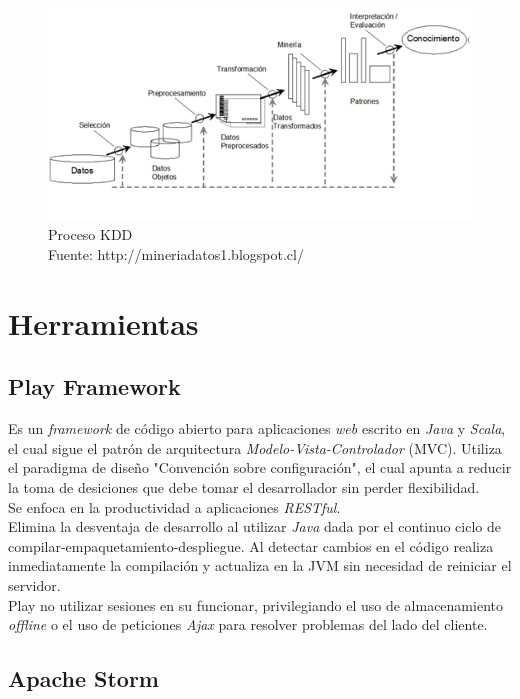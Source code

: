 \begin{figure}[!ht]
	\centering
	\captionsetup{justification=centering}
	\includegraphics[scale=1]{images/kdd.png}
	\caption[Proceso KDD.]{Proceso KDD\\Fuente: http://mineriadatos1.blogspot.cl/}
	\label{fig:procesoKDD}
\end{figure}



\section{Herramientas}

	\subsection{Play Framework}

	Es un \textit{framework} de código abierto para aplicaciones \textit{web} escrito en \textit{Java} y \textit{Scala}, el cual sigue el patrón de arquitectura \textit{Modelo-Vista-Controlador} (MVC). Utiliza el paradigma de diseño "Convención sobre configuración", el cual apunta a reducir la toma de desiciones que debe tomar el desarrollador sin perder flexibilidad. \\
	Se enfoca en la productividad a aplicaciones \textit{RESTful}.\\
	Elimina la desventaja de desarrollo al utilizar \textit{Java} dada por el continuo ciclo de compilar-empaquetamiento-despliegue. Al detectar cambios en el código realiza inmediatamente la compilación y actualiza en la JVM sin necesidad de reiniciar el servidor.\\
	Play no utilizar sesiones en su funcionar, privilegiando el uso de almacenamiento \textit{offline} o el uso de peticiones \textit{Ajax} para resolver problemas del lado del cliente.

	\subsection{Apache Storm}

